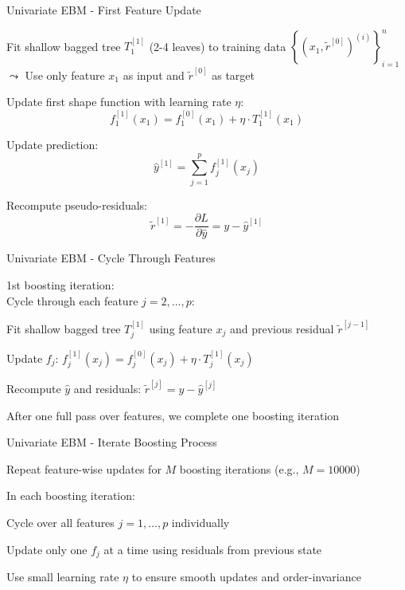 \documentclass[10pt,compress,t,notes=noshow, xcolor=table]{beamer}
\begin{document}
\begin{framev}[align=top]{Univariate EBM - First Feature Update}
\spacer[0.25]
\begin{itemizeM}
\item Fit shallow bagged tree $T_1^{[1]}$ (2-4 leaves) to training data $\left\{\left(x_1, \tilde{r}^{[0]}\right)^{(i)}\right\}_{i=1}^n$\\
$\leadsto$ Use only feature $x_1$ as input and $\tilde{r}^{[0]}$ as target
\item Update first shape function with learning rate $\eta$:
$$
f_1^{[1]}(x_1) = f_1^{[0]}(x_1) + \eta \cdot T_1^{[1]}(x_1)
$$
\item Update prediction:
$$
\hat{y}^{[1]} = \sum_{j=1}^p f_j^{[1]}(x_j)
$$
\item Recompute pseudo-residuals:
$$
\tilde{r}^{[1]} = -\frac{\partial L}{\partial \hat{y}} = y - \hat{y}^{[1]}
$$
\end{itemizeM}
\end{framev}


\begin{framev}[align=top]{Univariate EBM - Cycle Through Features}
\spacer[0.25]
\begin{itemizeM}
\item 1st boosting iteration:\\
Cycle through each feature $j = 2,\dots,p$:
\begin{itemizeS}
\item Fit shallow bagged tree $T_j^{[1]}$ using feature $x_j$ and previous residual $\tilde{r}^{[j-1]}$ %
\item Update $f_j$: $f_j^{[1]}(x_j) = f_j^{[0]}(x_j) + \eta \cdot T_j^{[1]}(x_j)$
\item Recompute $\hat{y}$ and residuals: $\tilde{r}^{[j]} = y - \hat{y}^{[j]}$
\end{itemizeS}
\item After one full pass over features, we complete one boosting iteration
\end{itemizeM}
\end{framev}


\begin{framev}[align=top]{Univariate EBM - Iterate Boosting Process}
\spacer[0.25]
\begin{itemizeM}
\item Repeat feature-wise updates for $M$ boosting iterations (e.g., $M=10000$)
\item In each boosting iteration:
\begin{itemizeS}
\item Cycle over all features $j=1,\dots,p$ individually %
\item Update only one $f_j$ at a time using residuals from previous state
\end{itemizeS}
\item Use small learning rate $\eta$ to ensure smooth updates and order-invariance
\end{itemizeM}
\end{framev}
\end{document}
